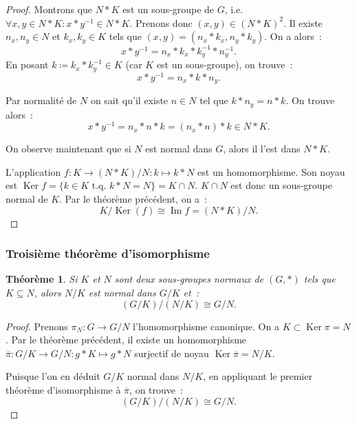 \documentclass{article}
\newtheorem{thm}{Théorème}[section]
\theoremstyle{definition}
\theoremstyle{remark}
\DeclareMathOperator{\Imf}{Im}
\DeclareMathOperator{\Ker}{Ker}
\newcommand{\tq}{\text{ t.q. }}
\newcommand{\simeqq}{\cong}
\begin{document}
			\begin{proof} Montrons que $N*K$ est un sous-groupe de $G$, i.e. $\forall x, y \in N*K : x*y^{-1} \in N*K$. Prenons donc $(x, y) \in (N*K)^2$.
			Il existe $n_x, n_y \in N$ et $k_x, k_y \in K$ tels que $(x, y) = (n_x*k_x, n_y*k_y)$. On a alors~:
			\[x*y^{-1} = n_x*k_x*k_y^{-1}*n_y^{-1}.\]
			En posant $k \coloneqq k_x*k_y^{-1} \in K$ (car $K$ est un sous-groupe), on trouve~:
			\[x*y^{-1} = n_x*k*n_y.\]

			Par normalité de $N$ on sait qu'il existe $n \in N$ tel que $k*n_y = n*k$. On trouve alors~:
			\[x*y^{-1} = n_x*n*k = (n_x*n)*k \in N*K.\]

			On observe maintenant que si $N$ est normal dans $G$, alors il l'est dans $N*K$.

			L'application $f : K \to (N*K)/N : k \mapsto k*N$ est un homomorphisme. Son noyau est $\Ker f = \{k \in K \tq k*N = N\} = K \cap N$.
			$K \cap N$ est donc un sous-groupe normal de $K$. Par le théorème précédent, on a~:
			\[K/\Ker(f) \simeqq \Imf f = (N*K)/N.\]
			\end{proof}

		\subsubsection{Troisième théorème d'isomorphisme}
			\begin{thm} Si $K$ et $N$ sont deux sous-groupes normaux de $(G, *)$ tels que $K \subseteq N$, alors $N/K$ est normal dans $G/K$ et~:
			\[\left(G/K\right)/\left(N/K\right) \simeqq G/N.\]
			\end{thm}

			\begin{proof} Prenons $\pi_N : G \to G/N$ l'homomorphisme canonique. On a $K \subset \Ker \pi = N$. Par le théorème précédent, il existe un
			homomorphisme $\overline \pi : G/K \to G/N : g*K \mapsto g*N$ surjectif de noyau $\Ker \overline \pi = N/K$.

			Puisque l'on en déduit $G/K$ normal dans $N/K$, en appliquant le premier théorème d'isomorphisme à $\overline \pi$, on trouve~:
			\[\left(G/K\right)/\left(N/K\right) \simeqq G/N.\]
			\end{proof}
\end{document}
